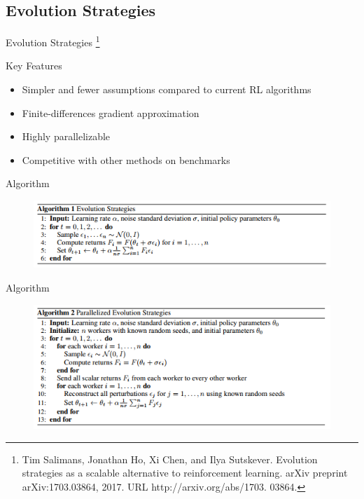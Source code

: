 \documentclass{beamer}
\begin{document}
	\subsection*{Evolution Strategies}
	
	\begin{frame}
		\Huge Evolution Strategies
		\footnote{Tim Salimans, Jonathan Ho, Xi Chen, and Ilya Sutskever. Evolution strategies as a scalable alternative to
reinforcement learning. arXiv preprint arXiv:1703.03864, 2017. URL http://arxiv.org/abs/1703.
03864.}
	\end{frame}
	
	\begin{frame}{Key Features}
		\begin{itemize}
			\item Simpler and fewer assumptions compared to current RL algorithms
			\item Finite-differences gradient approximation
			\item Highly parallelizable
			\item Competitive with other methods on benchmarks
		\end{itemize}
	\end{frame}
	
	\begin{frame}{Algorithm}
		\begin{figure}
			\centering
			\includegraphics[width=1.2\textheight]{es_algorithm.png}
		\end{figure}
	\end{frame}
	
	\begin{frame}{Algorithm}
		\begin{figure}
			\centering
			\includegraphics[width=1.2\textheight]{es_parallel.png}
		\end{figure}
	\end{frame}
	
\end{document}

